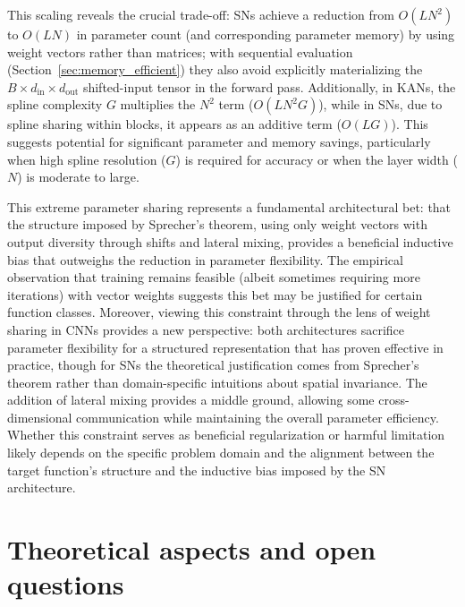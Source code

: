\documentclass{article}
\theoremstyle{plain}
\theoremstyle{definition}
\theoremstyle{remark}
\begin{document}
This scaling reveals the crucial trade-off: SNs achieve a reduction from $O(LN^2)$ to $O(LN)$ in parameter count (and corresponding parameter memory) by using weight vectors rather than matrices; with sequential evaluation (Section~\ref{sec:memory_efficient}) they also avoid explicitly materializing the $B\times d_{\mathrm{in}}\times d_{\mathrm{out}}$ shifted-input tensor in the forward pass. Additionally, in KANs, the spline complexity $G$ multiplies the $N^2$ term ($O(L N^2 G)$), while in SNs, due to spline sharing within blocks, it appears as an additive term ($O(L G)$). This suggests potential for significant parameter and memory savings, particularly when high spline resolution ($G$) is required for accuracy or when the layer width ($N$) is moderate to large.

This extreme parameter sharing represents a fundamental architectural bet: that the structure imposed by Sprecher's theorem, using only weight vectors with output diversity through shifts and lateral mixing, provides a beneficial inductive bias that outweighs the reduction in parameter flexibility. The empirical observation that training remains feasible (albeit sometimes requiring more iterations) with vector weights suggests this bet may be justified for certain function classes. Moreover, viewing this constraint through the lens of weight sharing in CNNs provides a new perspective: both architectures sacrifice parameter flexibility for a structured representation that has proven effective in practice, though for SNs the theoretical justification comes from Sprecher's theorem rather than domain-specific intuitions about spatial invariance. The addition of lateral mixing provides a middle ground, allowing some cross-dimensional communication while maintaining the overall parameter efficiency. Whether this constraint serves as beneficial regularization or harmful limitation likely depends on the specific problem domain and the alignment between the target function's structure and the inductive bias imposed by the SN architecture.

\section{Theoretical aspects and open questions}\label{sec:universality}
\end{document}
